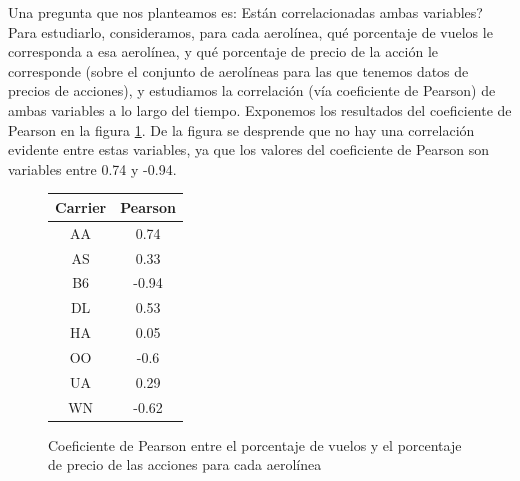 Una pregunta que nos planteamos es: \textquestiondown Est\'an correlacionadas ambas variables? Para
estudiarlo, consideramos, para cada aerol\'inea, qu\'e porcentaje de vuelos le corresponda a esa
aerol\'inea, y qu\'e porcentaje de precio de la acci\'on le corresponde (sobre el conjunto de aerol\'ineas para
las que tenemos datos de precios de acciones), y estudiamos la correlaci\'on (v\'ia coeficiente
de Pearson) de ambas variables a lo largo del tiempo. Exponemos los resultados del coeficiente de Pearson en la figura
\ref{table:pearson}. De la figura se desprende que no hay una correlaci\'on evidente entre estas variables,
ya que los valores del coeficiente de Pearson son variables entre 0.74 y -0.94.

\begin{figure}
\tiny
\begin{center}
  \begin{tabular}{||c || c ||}
 \hline
 Carrier & Pearson \\ [1ex]
 \hline\hline
 AA & 0.74 \\
 \hline
 AS & 0.33 \\
 \hline
 B6 & -0.94 \\
 \hline
 DL & 0.53 \\
 \hline
 HA & 0.05 \\
 \hline
 OO & -0.6 \\
 \hline
 UA & 0.29 \\
 \hline
 WN & -0.62 \\ [1ex]
 \hline
\end{tabular}
\end{center}
\caption{Coeficiente de Pearson entre el porcentaje de vuelos
y el porcentaje de precio de las acciones para cada aerol\'inea}
\label{table:pearson}
\end{figure}
